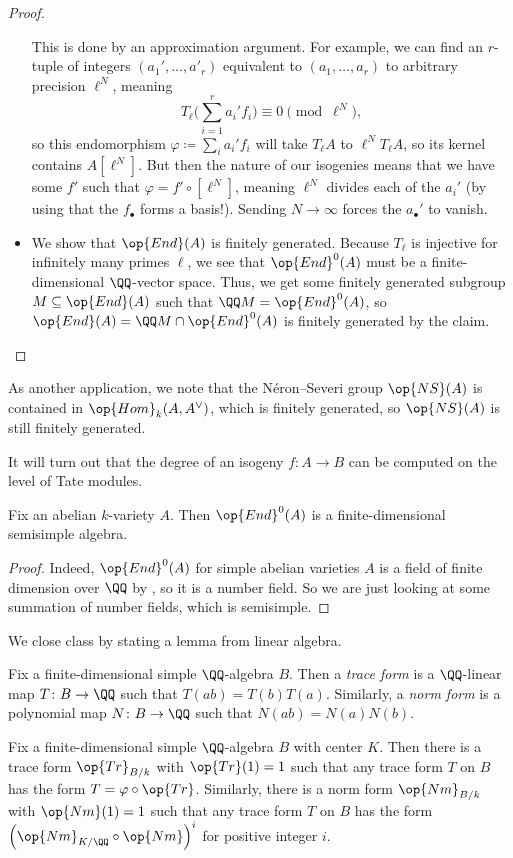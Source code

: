 \documentclass[../notes.tex]{subfiles}
\begin{document}
\begin{proof}
\begin{itemize}
		This is done by an approximation argument. For example, we can find an $r$-tuple of integers $(a_1',\ldots,a'_r)$ equivalent to $(a_1,\ldots,a_r)$ to arbitrary precision $\ell^N$, meaning
		\[T_\ell\Bigg(\sum_{i=1}^ra_i'f_i\Bigg)\equiv0\pmod{\ell^N},\]
		so this endomorphism $\varphi\coloneqq\sum_ia_i'f_i$ will take $T_\ell A$ to $\ell^NT_\ell A$, so its kernel contains $A\left[\ell^N\right]$. But then the nature of our isogenies means that we have some $f'$ such that $\varphi=f'\circ\left[\ell^N\right]$, meaning $\ell^N$ divides each of the $a_i'$ (by using that the $f_\bullet$ forms a basis!). Sending $N\to\infty$ forces the $a_\bullet'$ to vanish.

		\item We show that $\op{End}(A)$ is finitely generated. Because $T_\ell$ is injective for infinitely many primes $\ell$, we see that $\op{End}^0(A)$ must be a finite-dimensional $\QQ$-vector space. Thus, we get some finitely generated subgroup $M\subseteq\op{End}(A)$ such that $\QQ M=\op{End}^0(A)$, so $\op{End}(A)=\QQ M\cap\op{End}^0(A)$ is finitely generated by the claim.
		\qedhere
	\end{itemize}
\end{proof}
\begin{remark}
	As another application, we note that the N\'eron--Severi group $\op{NS}(A)$ is contained in $\op{Hom}_k(A,A^\lor)$, which is finitely generated, so $\op{NS}(A)$ is still finitely generated.
\end{remark}
\begin{remark}
	It will turn out that the degree of an isogeny $f\colon A\to B$ can be computed on the level of Tate modules.
\end{remark}
\begin{corollary}
	Fix an abelian $k$-variety $A$. Then $\op{End}^0(A)$ is a finite-dimensional semisimple algebra.
\end{corollary}
\begin{proof}
	Indeed, $\op{End}^0(A)$ for simple abelian varieties $A$ is a field of finite dimension over $\QQ$ by , so it is a number field. So we are just looking at some summation of number fields, which is semisimple.
\end{proof}
We close class by stating a lemma from linear algebra.
\begin{definition}
	Fix a finite-dimensional simple $\QQ$-algebra $B$. Then a \textit{trace form} is a $\QQ$-linear map $T\colon B\to\QQ$ such that $T(ab)=T(b)T(a)$. Similarly, a \textit{norm form} is a polynomial map $N\colon B\to\QQ$ such that $N(ab)=N(a)N(b)$.
\end{definition}
\begin{proposition}
	Fix a finite-dimensional simple $\QQ$-algebra $B$ with center $K$. Then there is a trace form $\op{Tr}_{B/k}$ with $\op{Tr}(1)=1$ such that any trace form $T$ on $B$ has the form $T=\varphi\circ\op{Tr}$. Similarly, there is a norm form $\op{Nm}_{B/k}$ with $\op{Nm}(1)=1$ such that any trace form $T$ on $B$ has the form $\left({\op{Nm}_{K/\QQ}}\circ\op{Nm}\right)^i$ for positive integer $i$.
\end{proposition}
\end{document}
